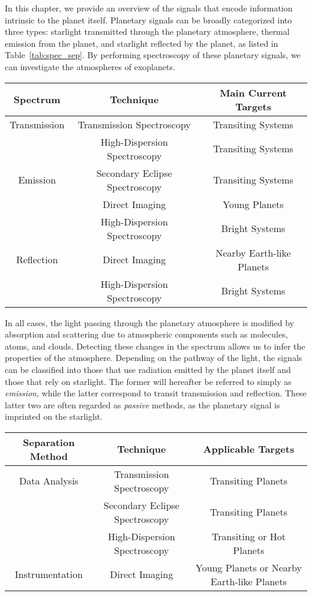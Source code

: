 \documentclass[a4paper,twocolumn]{report}
\begin{document}
In this chapter, we provide an overview of the signals that encode information intrinsic to the planet itself. Planetary signals can be broadly categorized into three types: starlight transmitted through the planetary atmosphere, thermal emission from the planet, and starlight reflected by the planet, as listed in  Table~\ref{tab:spec_sep}. By performing spectroscopy of these planetary signals, we can investigate the atmospheres of exoplanets. 
\begin{table*}[htbp]
\footnotesize
\centering
\caption{Classification of Spectral Types}
\label{tab:spec_sep}
\begin{tabular}{ccc}
\hline
Spectrum & Technique & Main Current Targets \\
\hline
Transmission & Transmission Spectroscopy & Transiting Systems \\
             & High-Dispersion Spectroscopy & Transiting Systems \\
\hline
Emission & Secondary Eclipse Spectroscopy & Transiting Systems \\
         & Direct Imaging & Young Planets \\
         & High-Dispersion Spectroscopy & Bright Systems \\
\hline
Reflection & Direct Imaging & Nearby Earth-like Planets \\
           & High-Dispersion Spectroscopy & Bright Systems \\
\hline
\end{tabular}
\end{table*}
In all cases, the light passing through the planetary atmosphere is modified by absorption and scattering due to atmospheric components such as molecules, atoms, and clouds. Detecting these changes in the spectrum allows us to infer the properties of the atmosphere. Depending on the pathway of the light, the signals can be classified into those that use radiation emitted by the planet itself and those that rely on starlight. The former will hereafter be referred to simply as \textit{emission}, while the latter correspond to transit transmission and reflection. These latter two are often regarded as \textit{passive} methods, as the planetary signal is imprinted on the starlight. 

\begin{table*}[htbp]
\footnotesize
\centering
\caption{Classification of Exoplanet Spectroscopic Methods}
\label{tab:light_sep}
\begin{tabular}{ccc}
\hline
Separation Method & Technique & Applicable Targets \\
\hline
Data Analysis & Transmission Spectroscopy & Transiting Planets \\
              & Secondary Eclipse Spectroscopy & Transiting Planets \\
              & High-Dispersion Spectroscopy & Transiting or Hot Planets \\
\hline
Instrumentation & Direct Imaging & Young Planets or Nearby Earth-like Planets \\
\hline
\end{tabular}
\end{table*}
\end{document}
